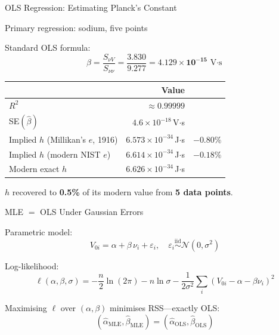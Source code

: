 \documentclass[aspectratio=169]{beamer}
\begin{document}
\begin{frame}{OLS Regression: Estimating Planck's Constant}

Primary regression: sodium, five points

\medskip
Standard OLS formula:
\[
  \hat\beta = \frac{S_{\nu V}}{S_{\nu\nu}}
            = \frac{3.830}{9.277}
            = \mathbf{4.129\times10^{-15}}\,\text{V$\cdot$s}
\]

\medskip
\begin{center}
\begin{tabular}{p{4.5cm}rr}
\toprule
 & Value & \\
\midrule
$R^2$ & $\approx 0.99999$ & \\
SE$(\hat\beta)$ & $4.6\times10^{-18}$\,V$\cdot$s & \\
Implied $h$ (Millikan's $e$, 1916) & $6.573\times10^{-34}$\,J$\cdot$s & $-0.80\%$ \\
Implied $h$ (modern NIST $e$) & $6.614\times10^{-34}$\,J$\cdot$s & $-0.18\%$ \\
Modern exact $h$ & $6.626\times10^{-34}$\,J$\cdot$s & \\
\bottomrule
\end{tabular}
\end{center}

\medskip
$h$ recovered to \textbf{0.5\%} of its modern value from \textbf{5 data points}.

\end{frame}

\begin{frame}{MLE $=$ OLS Under Gaussian Errors}

Parametric model:
\[
  V_{0i} = \alpha + \beta\,\nu_i + \varepsilon_i,
  \quad
  \varepsilon_i \overset{\text{iid}}{\sim} \mathcal{N}(0,\sigma^2)
\]

Log-likelihood:
\[
  \ell(\alpha,\beta,\sigma) =
  -\frac{n}{2}\ln(2\pi) - n\ln\sigma
  - \frac{1}{2\sigma^2}\sum_{i}(V_{0i}-\alpha-\beta\nu_i)^2
\]

Maximising $\ell$ over $(\alpha,\beta)$ minimises RSS---exactly OLS:
\[
  (\hat\alpha_{\mathrm{MLE}},\hat\beta_{\mathrm{MLE}}) =
         (\hat\alpha_{\mathrm{OLS}},\hat\beta_{\mathrm{OLS}})
\]
%

\end{frame}
\end{document}
